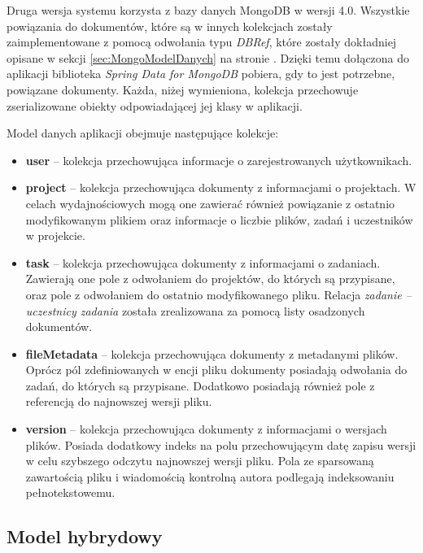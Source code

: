 Druga wersja systemu korzysta z bazy danych MongoDB w wersji 4.0.
Wszystkie powiązania do dokumentów, które są w innych kolekcjach zostały zaimplementowane z pomocą odwołania typu \textit{DBRef}, które zostały dokładniej opisane w sekcji \ref{sec:MongoModelDanych} na stronie \pageref{sec:MongoModelDanych}.
Dzięki temu dołączona do aplikacji biblioteka \textit{Spring Data for MongoDB} pobiera, gdy to jest potrzebne, powiązane dokumenty. 
Każda, niżej wymieniona, kolekcja przechowuje zserializowane obiekty odpowiadającej jej klasy w aplikacji.

Model danych aplikacji obejmuje następujące kolekcje:
\begin{itemize}
    \item \textbf{user} -- kolekcja przechowująca informacje o zarejestrowanych użytkownikach.

    \item \textbf{project} -- kolekcja przechowująca dokumenty z informacjami o projektach.
    W celach wydajnościowych mogą one zawierać również powiązanie z ostatnio modyfikowanym plikiem oraz informacje o liczbie plików, zadań i uczestników w projekcie.
    
    \item \textbf{task} -- kolekcja przechowująca dokumenty z informacjami o zadaniach.
    Zawierają one pole z odwołaniem do projektów, do których są przypisane, oraz pole z odwołaniem do ostatnio modyfikowanego pliku.
    Relacja \textit{zadanie -- uczestnicy zadania} została zrealizowana za pomocą listy osadzonych dokumentów.
    
    \item \textbf{fileMetadata} -- kolekcja przechowująca dokumenty z metadanymi plików.
    Oprócz pól zdefiniowanych w encji pliku dokumenty posiadają odwołania do zadań, do których są przypisane.
    Dodatkowo posiadają również pole z referencją do najnowszej wersji pliku.
    
    \item \textbf{version} -- kolekcja przechowująca dokumenty z informacjami o wersjach plików.
    Posiada dodatkowy indeks na polu przechowującym datę zapisu wersji w celu szybszego odczytu najnowszej wersji pliku.
    Pola ze sparsowaną zawartością pliku i wiadomością kontrolną autora podlegają indeksowaniu pełnotekstowemu.
\end{itemize}

\subsection{Model hybrydowy}

